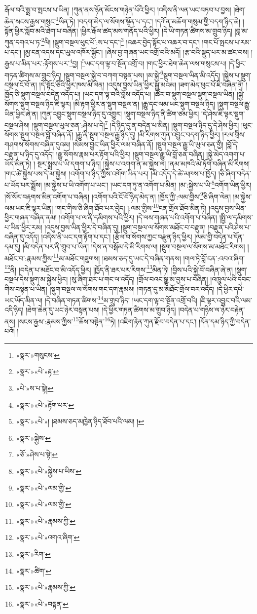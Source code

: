 རྒོལ་བའི་སྨྲ་བ་སྤངས་པ་ཡིན། །ཀུན་ནས་ཉོན་མོངས་གཉེན་པོའི་ཕྱིར། །འདིས་ནི་ལན་ཡང་བཏབ་པ་བྱས། །ཐེག་ཆེན་སངས་རྒྱས་གསུང་\footnote{«སྣར་»གསུངས་}ཡིན་ཏེ། །བདག་མེད་ལ་སོགས་སྟོན་པ་དང་། །དཀོན་མཆོག་གསུམ་གྱི་བདག་ཉིད་ཆེ། །སྟོན་ཕྱིར་སློབ་མའི་ཐེག་པ་བཞིན། །ཕྱིར་རྒོལ་ཚད་མས་གནོད་པའི་ཕྱིར། །དེ་ཡི་གཏན་ཚིགས་མ་གྲུབ་ཉིད། །བླ་མ་ཀུན་དགའ་པ་ཏ་\footnote{«སྣར་»«པེ་»རྟ་}ལི། །སྡུག་བསྔལ་ཕུང་པོ་:ས་པ་དང་།\footnote{«པེ་»ས་པ་སྟེ།} །འཆར་བྱེད་སྟོང་པ་འཆར་བ་དང་། །གང་པོ་སྤངས་པ་རམ་པ་དང་། །མྱ་ངན་འདས་དང་ཡུལ་འཁོར་སྐྱོང་། །ཞེས་བྱ་གཞན་ཡང་འགྲོ་བའི་མདོ། །རྩ་བའི་སྡུད་པར་མ་ཚང་བས། །རྒྱས་པ་མིན་པར་:རྟོགས་པར་\footnote{«སྣར་»«པེ་»རྟོག་པར་}བྱ། །\footnote{«སྣར་»«པེ་»། །ཐམས་ཅད་མཁྱེན་ཉིད་ཐོབ་པའི་ལམ། །}ཡང་དག་ལྟ་བ་སྔོན་འགྲོ་བ། །གང་ཕྱིར་ཐེག་ཆེན་ལས་གསུངས་པ། །དེ་ཕྱིར་གཏན་ཚིགས་མ་གྲུབ་ཉིད། །སྡུག་བསྔལ་སྐྱེ་བ་བཀག་བསྟན་པས། །མ་སྐྱེ་\footnote{«སྣར་»སྐྱེས་}སྡུག་བསྔལ་ཡིན་མི་འདོད། །སྐྱེས་པ་སྡུག་བསྔལ་ངོ་བོ་ན། །དེ་སྟོང་ཅིའི་ཕྱིར་ཁས་མི་ལེན། །འདུས་བྱས་ཡིན་ཕྱིར་སྒྱུ་མའམ། །ཟག་མེད་ཕུང་པོ་ཇི་བཞིན་ནོ། །ཁྱོད་ཅི་སྡུག་བསྔལ་བདེན་འདོད་པ། །ཡང་དག་ལྟ་བའི་བློས་འདོད་པ། །ཚོར་བ་སྡུག་བསྔལ་སྡུག་བསྔལ་ཡིན། །སྐྱེ་སོགས་སྡུག་བསྔལ་ཉིད་ཇི་ལྟར། །མི་རྟག་ཕྱིར་ན་སྡུག་བསྔལ་ན། །རྒྱུ་དང་ལམ་ཡང་སྡུག་བསྔལ་ཉིད། །སྡུག་བསྔལ་རྒྱུ་ཡིན་ཕྱིར་ཞེ་ན། །ཀུན་འབྱུང་སྡུག་བསྔལ་ཉིད་དུ་འགྱུར། །སྡུག་བསྔལ་ཉིད་ནི་ཚིག་ཙམ་ཕྱིར། །དེ་ཤེས་ཇི་ལྟར་སྡུག་བསྔལ་ཤེས། །སྡུག་བསྔལ་ཡུལ་ཅན་:ཤེས་པ་དེ།\footnote{«ཅོ་»ཤེས་པ་སྟེ།} །དེ་ཉིད་དུ་ན་བདེན་པ་མིན། །སྡུག་བསྔལ་ཉིད་དུ་དེ་ཤེས་ཕྱིར། །ཕུང་སོགས་སྡུག་བསྔལ་བློ་བཞིན་ནོ། །རྒྱུ་ནི་སྡུག་བསྔལ་རྒྱུ་ཉིད་དུ། །མི་རིགས་ཀུན་འབྱུང་བདག་ཉིད་ཕྱིར། །རལ་གྲིས་གཤགས་སོགས་བཞིན་དུའམ། །སེམས་བྱུང་ཡིན་ཕྱིར་ལམ་བཞིན་ནོ། །སྡུག་བསྔལ་རྒྱུ་ཡི་ཡུལ་ཅན་གྱི། །བློ་དེ་བརྫུན་པ་ཉིད་དུ་འདོད། །རྒྱུ་སོགས་རྣམ་པར་རྟོག་པའི་ཕྱིར། །སྡུག་བསྔལ་རྒྱུ་ཡི་བློ་ཅན་བཞིན། །སྐྱེ་མེད་འགག་པ་ཡོད་མིན་ཏེ། །
སྔར་སྨྲས་པ་ཡི་དགག་པ་ཉིད། །སྐྱེས་པ་འགག་ན་མ་སྐྱེས་ལ། །ནམ་མཁའི་མེ་ཏོག་བཞིན་མི་རིགས། །གང་ཚེ་སྐྱེས་པས་དེ་མ་སྐྱེས། །འགོག་པ་ཉིད་ཀྱིས་འགོག་ཡིན་པར། །མི་འདོད་དེ་ཚེ་མཁས་པ་ཁྱོད། །ཅི་ཞིག་བདེན་པ་ཡོད་པར་སྨྲོས། །མ་སྐྱེས་པ་ཡི་འགོག་པ་ཡང་། །ཡང་དག་ཏུ་ན་འགོག་པ་མིན། །མ་:སྐྱེས་པ་ཡི་\footnote{«སྣར་»«པེ་»སྐྱེས་པ་ཡིས་}འགོག་ཡིན་ཕྱིར། །སོ་སོར་བརྟགས་མིན་འགོག་པ་བཞིན། །འགོག་པའི་ངོ་བོ་ཉིད་མེད་ན། །ཁྱོད་ཀྱི་:ལམ་གྱིས་\footnote{«སྣར་»«པེ་»ལམ་གྱི་}ཅི་ཞིག་ལེན། །མ་སྐྱེས་ལམ་ཡང་ཇི་ལྟར་ཡིན། །གང་གིས་ཅི་ཞིག་ཐོབ་པར་བྱེད། །:ལམ་གྱིས་\footnote{«སྣར་»«པེ་»ལམ་གྱི་}ངན་གྲོལ་ཐོབ་མིན་ཏེ། །འདུས་བྱས་ཡིན་ཕྱིར་གཞན་བཞིན་ནམ། །འགོག་པ་ལ་ནི་དམིགས་པའི་ཕྱིར། །དེ་ལས་གཞན་པའི་འགོག་པ་བཞིན། །སྤྱི་ལ་དམིགས་པ་ཡིན་ཕྱིར་རམ། །འདུས་བྱས་ཡིན་ཕྱིར་དེ་བཞིན་དུ། །སྡུག་བསྔལ་ལ་སོགས་མཐོང་བ་བརྫུན། །བརྫུན་པའི་ཤེས་པ་བཞིན་དུ་འདོད། །འདིས་ནི་ཡང་དག་རྟོག་པ་དང་། །རྩོལ་བ་སོགས་ཀྱང་བརྫུན་ཉིད་ཕྱིར། །ལམ་གྱི་བདེན་པ་དོན་དམ་དུ། །མི་བདེན་པར་ནི་གྲུབ་པ་ཡིན། །དེས་ན་བསྒོམ་དེ་མི་རིགས་ལ། །སྡུག་བསྔལ་ལ་སོགས་མ་མཐོང་རིགས། །མཐོང་བ་:རྣམས་ཀྱིས་\footnote{«སྣར་»«པེ་»རྣམས་ཀྱི་}མ་མཐོང་གཟུགས། །ཐམས་ཅད་དུ་ཡང་དེ་བཞིན་གནས། །གལ་ཏེ་བློ་ངན་:འབའ་ཞིག་\footnote{«སྣར་»«པེ་»འགའ་ཞིག་}ནི། །བདེན་པ་མཐོང་བ་མི་འདོད་ཕྱིར། །ཁྱོད་ནི་ཐར་པར་རིགས་\footnote{«སྣར་»རིག་}མིན་ཏེ། །བྱིས་པའི་སྐྱེ་བོ་བཞིན་ཞེ་ན། །སྡུག་བསྔལ་དེས་སྡུག་མ་སྐྱེས་ཕྱིར། །སུ་ཞིག་ཐར་པ་གང་ལ་འདོད། །གྲོལ་བའང་སྒྱུ་མ་བྱས་པ་བཞིན། །འཁྲུལ་པའི་དབང་གིས་བསྟན་པ་ཡིན། །སྡུག་བསྔལ་ལ་སོགས་གང་དག་རྣམས། །གཏན་དུ་མ་མཐོང་གྲོལ་བར་འདོད། །དེ་ཕྱིར་དཔེ་ཡང་ཡོད་མིན་ལ། །དེ་བཞིན་གཏན་ཚིགས་\footnote{«སྣར་»ཚིག་}མ་གྲུབ་ཉིད། །ཡང་དག་ལྟ་བ་སྔོན་འགྲོ་བའི། །ཇི་ལྟར་འབྱུང་བའི་ལམ་འདི་ཉིད། །ཐེག་ཆེན་དུ་ཡང་ཉེར་བསྟན་པས། །དེ་ཕྱིར་གཏན་ཚིགས་མ་གྲུབ་ཉིད། །བདེན་པ་གཉིས་ལ་ཉེར་བརྟེན་ནས། །སངས་རྒྱས་:རྣམས་ཀྱིས་\footnote{«སྣར་»«པེ་»རྣམས་ཀྱི་}ཆོས་བསྟེན་\footnote{«སྣར་»«པེ་»བསྟན་}ཏེ། །འཇིག་རྟེན་ཀུན་རྫོབ་བདེན་པ་དང་། །དོན་དམ་ཉིད་ཀྱི་བདེན་པའོ། །
